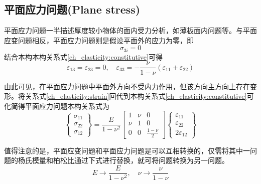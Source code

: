 \subsection{平面应力问题(Plane stress)}
平面应力问题一半描述厚度较小物体的面内受力分析，如薄板面内问题等。与平面应变问题相反，平面应力问题则是假设平面外的应力为零，即
\begin{equation}
\sigma_{3i} = 0
\end{equation}
结合本构本构关系式\eqref{ch_elasticity:constitutive}可得
\begin{equation}\label{ch_elasticity:strain}
\varepsilon_{13} = \varepsilon_{23} = 0,\quad \varepsilon_{33} = - \frac{\nu}{1-\nu}(\varepsilon_{11}+\varepsilon_{22})
\end{equation}\par
由此可见，在平面应力问题中平面外方向不受内力作用，但该方向主方向上存在变形。将关系式\eqref{ch_elasticity:strain}回代到本构关系式\eqref{ch_elasticity:constitutive}可化简得平面应力问题本构关系式为
\begin{equation}
\begin{Bmatrix}
\sigma_{11} \\ \sigma_{22} \\ \sigma_{12}
\end{Bmatrix} = \frac{E}{1-\nu^2}
\begin{bmatrix}
    1 & \nu & 0 \\
    \nu & 1 & 0 \\
    0 & 0 & \frac{1-\nu}{2}
\end{bmatrix}
\begin{Bmatrix}
\varepsilon_{11} \\ \varepsilon_{22} \\ 2\varepsilon_{12}
\end{Bmatrix}
\end{equation}\par
值得注意的是，平面应变问题和平面应力问题是可以互相转换的，仅需将其中一问题的杨氏模量和柏松比通过下式进行替换，就可将问题转换为另一问题。
\begin{equation}
E\rightarrow \frac{E}{1-\nu^2},\quad \nu\rightarrow \frac{\nu}{1-\nu}
\end{equation}

